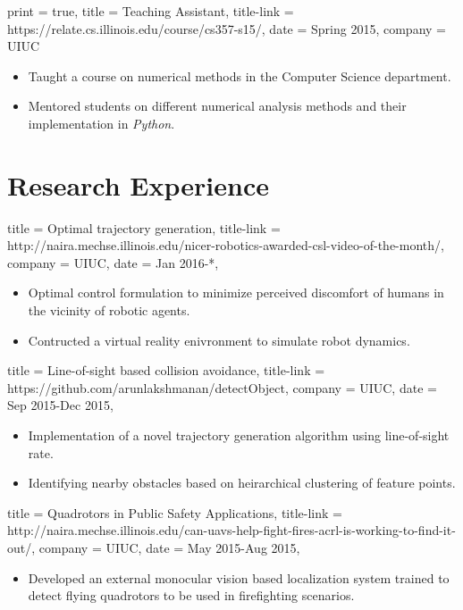 \documentclass{simplecv}
\begin{document}
\begin{position}
  {
      print   = true,
      title   = Teaching Assistant,
      title-link = https://relate.cs.illinois.edu/course/cs357-s15/,
      date    = Spring 2015,
      company = UIUC
  }

  \begin{itemize}
      \item Taught a course on numerical methods in the Computer Science department.
      \item Mentored students on different numerical analysis methods and their implementation in \textit{Python}.
  \end{itemize}
\end{position}

\section{Research Experience}

\begin{position}
  {
      title   = Optimal trajectory generation,
      title-link = http://naira.mechse.illinois.edu/nicer-robotics-awarded-csl-video-of-the-month/,
      company = UIUC,
      date    = Jan 2016-*,
  }

  \begin{itemize}
      \item Optimal control formulation to minimize perceived discomfort of humans in the vicinity of robotic agents.   

      \item Contructed a virtual reality enivronment to simulate robot dynamics.
\end{itemize}
\end{position}

\begin{position}
  {
      title   = Line-of-sight based collision avoidance,
      title-link = https://github.com/arunlakshmanan/detectObject,
      company = UIUC,
      date    = Sep 2015-Dec 2015,
  }

\begin{itemize}
    \item Implementation of a novel trajectory generation algorithm using line-of-sight rate.
    \item Identifying nearby obstacles based on heirarchical clustering of feature points. 
\end{itemize}
\end{position}

\begin{position}
  {
      title   = Quadrotors in Public Safety Applications,
      title-link = http://naira.mechse.illinois.edu/can-uavs-help-fight-fires-acrl-is-working-to-find-it-out/,
      company = UIUC,
      date    = May 2015-Aug 2015,
  }

\begin{itemize}
    \item Developed an external monocular vision based localization system trained to detect flying quadrotors to be used in firefighting scenarios.
\end{itemize}
\end{position}
\end{document}
